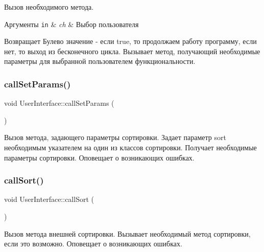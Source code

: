 Вызов необходимого метода. 


\begin{DoxyParams}[1]{Аргументы}
\mbox{\tt in}  & {\em ch} & Выбор пользователя \\
\hline
\end{DoxyParams}
\begin{DoxyReturn}{Возвращает}
Булево значение -\/ если true, то продолжаем работу программу, если нет, то выход из бесконечного цикла. Вызывает метод, получающий необходимые параметры для выбранной пользователем функциональности. 
\end{DoxyReturn}
\hypertarget{class_user_interface_adcabf6c8f2be4b4ec712c4674156bf59}{}\label{class_user_interface_adcabf6c8f2be4b4ec712c4674156bf59} 
\subsubsection{\texorpdfstring{call\+Set\+Params()}{callSetParams()}}
{\footnotesize\ttfamily void User\+Interface\+::call\+Set\+Params (\begin{DoxyParamCaption}{ }\end{DoxyParamCaption})\hspace{0.3cm}{\ttfamily [private]}}



Вызов метода, задающего параметры сортировки. Задает параметр sort необходимым указателем на один из классов сортировки. Получает необходимые параметры сортировки. Оповещает о возникающих ошибках. 

\hypertarget{class_user_interface_a0e03dfecee7e890ad1e076888062d5cb}{}\label{class_user_interface_a0e03dfecee7e890ad1e076888062d5cb} 
\subsubsection{\texorpdfstring{call\+Sort()}{callSort()}}
{\footnotesize\ttfamily void User\+Interface\+::call\+Sort (\begin{DoxyParamCaption}{ }\end{DoxyParamCaption})\hspace{0.3cm}{\ttfamily [private]}}



Вызов метода внешней сортировки. Вызывает необходимый метод сортировки, если это возможно. Оповещает о возникающих ошибках. 

